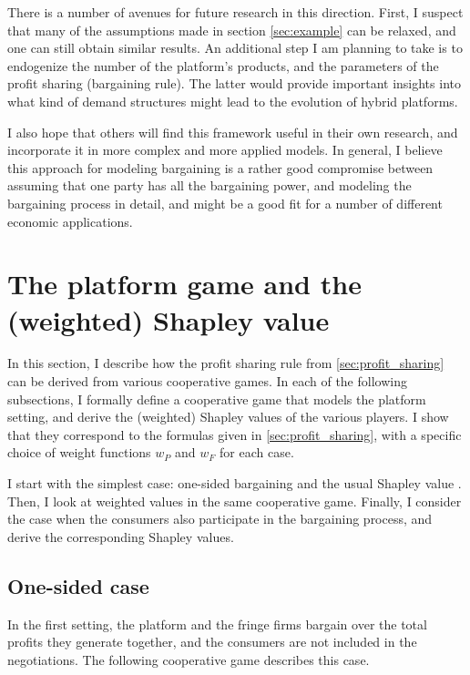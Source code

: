 \documentclass[a4paper]{article}
\begin{document}
There is a number of avenues for future research in this direction.
First, I suspect that many of the assumptions made in section \cref{sec:example} can be relaxed, and one can still obtain similar results.
An additional step I am planning to take is to endogenize the number of the platform's products, and the parameters of the profit sharing (bargaining rule).
The latter would provide important insights into what kind of demand structures might lead to the evolution of hybrid platforms.

I also hope that others will find this framework useful in their own research, and incorporate it in more complex and more applied models.
In general, I believe this approach for modeling bargaining is a rather good compromise between assuming that one party has all the bargaining power, and modeling the bargaining process in detail, and might be a good fit for a number of different economic applications.


\appendix

\printbibliography


\section{The platform game and the (weighted) Shapley value}
\label{sec:cooperative_game}

In this section, I describe how the profit sharing rule from \cref{sec:profit_sharing} can be derived from various cooperative games.
In each of the following subsections, I formally define a cooperative game that models the platform setting, and derive the (weighted) Shapley values of the various players.
I show that they correspond to the formulas given in \cref{sec:profit_sharing}, with a specific choice of weight functions $w_P$ and $w_F$ for each case.

I start with the simplest case: one-sided bargaining and the usual Shapley value \parencite{shapley1953additive}.
Then, I look at weighted values \parencite{weber1988probabilistic} in the same cooperative game.
Finally, I consider the case when the consumers also participate in the bargaining process, and derive the corresponding Shapley values.

\subsection{One-sided case}
\label{sec:cooperative_game_one_sided}

In the first setting, the platform and the fringe firms bargain over the total profits they generate together, and the consumers are not included in the negotiations.
The following cooperative game describes this case.
\end{document}
